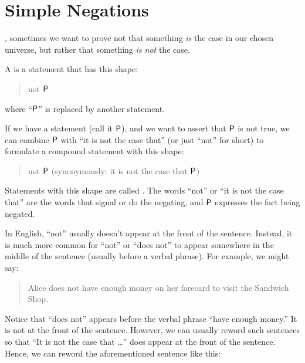 \documentclass[../../../main.tex]{subfiles}
\begin{document}
\section{Simple Negations}

, sometimes we want to prove not that something \emph{is} the case in our chosen universe, but rather that something \emph{is not} the case.

\begin{terminology}
  A  is a statement that has this shape:
    
  \begin{quote}
    not $\P/$
  \end{quote}
    
  \noindent
  where ``$\P/$'' is replaced by another statement.
\end{terminology}

If we have a statement (call it $\P/$), and we want to assert that $\P/$ is not true, we can combine $\P/$ with ``it is not the case that'' (or just ``not'' for short) to formulate a compound statement with this shape:

\begin{quote}
  not $\P/$ \hskip 1cm (synonymously: it is not the case that $\P/$)
\end{quote}

\noindent
Statements with this shape are called . The words ``not'' or ``it is not the case that'' are the words that signal or do the negating, and $\P/$ expresses the fact being negated.

In English, ``not'' usually doesn't appear at the front of the sentence. Instead, it is much more common for ``not'' or ``does not'' to appear somewhere in the middle of the sentence (usually before a verbal phrase). For example, we might say: 
    
\begin{quote}
  Alice does not have enough money on her farecard to visit the Sandwich Shop.
\end{quote}
    
Notice that ``does not'' appears before the verbal phrase ``have enough money.'' It is not at the front of the sentence. However, we can usually reword such sentences so that ``It is not the case that \ldots'' does appear at the front of the sentence. Hence, we can reword the aforementioned sentence like this:
    
\end{document}
